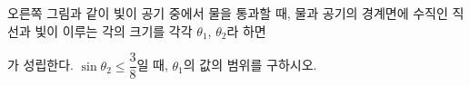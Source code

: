 \noindent\begin{minipage}[t]{0.58\linewidth}\vspace{0pt}\raggedright 오른쪽 그림과 같이 빛이 공기 중에서 물을 통과할 때, 물과 공기의 경계면에 수직인 직선과 빛이 이루는 각의 크기를 각각 $\theta_1$, $\theta_2$라 하면\par\smallskip\end{minipage}\hfill\begin{minipage}[t]{0.4\linewidth}\vspace{0pt}\centering \resizebox{\ifdim\width>\linewidth\linewidth\else\width\fi}{!}{}\end{minipage}\par
\noindent {}\par\smallskip\noindent 가 성립한다. $\sin\theta_2\le\dfrac{3}{8}$일 때, $\theta_1$의 값의 범위를 구하시오. 
